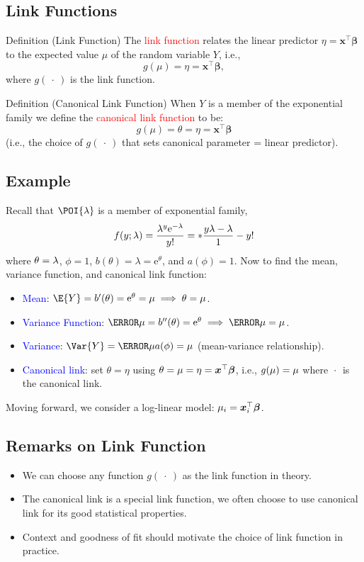 \documentclass[oneside]{book}\usepackage[]{graphicx}\usepackage[svgnames]{xcolor}
\let\exp\relax%
\let\log\relax%
\providecommand{\Vector}[1]{\bm{#1}}%
\begin{document}
\subsection*{Link Functions}
\begin{Regular}{Definition (Link Function)}
      The \textcolor{Red}{link function} relates the linear predictor $ \eta=\Vector{x}^\top\Vector{\beta} $ to the expected value $ \mu $ of the random variable $ Y $, i.e.,
      \[ g(\mu)=\eta=\Vector{x}^\top\Vector{\beta}, \]
      where $ g(\:\cdot\:) $ is the link function.
\end{Regular}
\begin{Regular}{Definition (Canonical Link Function)}
      When $Y$ is a member of the exponential family we define the \textcolor{Red}{canonical link function} to be:
      \[ g(\mu)=\theta=\eta=\Vector{x}^\top\Vector{\beta} \]
      (i.e., the choice of $ g(\:\cdot\:) $ that sets canonical parameter = linear predictor).
\end{Regular}
\subsection*{Example}
Recall that $ \POI{\lambda} $ is a member of exponential family,
\[ f(y;\lambda)=\frac{\lambda^y \mathrm{e}^{-\lambda}}{y!}=\exp*{\frac{y\log{\lambda}-\lambda}{1}-\log{y!}}  \]
where $ \theta=\log{\lambda} $, $ \phi=1 $, $ b(\theta)=\lambda=\mathrm{e}^{\theta} $, and $ a(\phi)=1 $. Now to find the mean, variance function, and canonical link function:
\begin{itemize}
      \item \textcolor{Blue}{Mean}: $ \E{Y}=b^\prime(\theta)=\mathrm{e}^{\theta}=\mu\implies \theta=\log{\mu} $.
      \item \textcolor{Blue}{Variance Function}: $ \V{\mu}=b^{\prime\prime}(\theta)=\mathrm{e}^{\theta}\implies \V{\mu}=\mu $.
      \item \textcolor{Blue}{Variance}: $ \Var{Y}=\V{\mu}a(\phi)=\mu $ (mean-variance relationship).
      \item \textcolor{Blue}{Canonical link}: set $ \theta=\eta $ using $ \theta=\log{\mu}=\eta=\Vector{x}^\top \Vector{\beta} $, i.e., $ g(\mu)=\log{\mu} $ where $ \log{\:\cdot\:} $
            is the canonical link.
\end{itemize}
Moving forward, we consider a log-linear model: $ \log{\mu_i}=\Vector{x}_i^\top \Vector{\beta} $.

\subsection*{Remarks on Link Function}
\begin{itemize}
      \item We can choose any function $ g(\:\cdot\:) $ as the link function in theory.
      \item The canonical link is a special link function, we often choose to use
            canonical link for its good statistical properties.
      \item Context and goodness of fit should motivate the choice of link function in
            practice.
\end{itemize}
\end{document}
